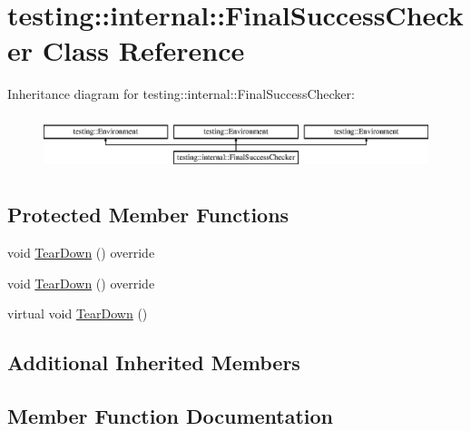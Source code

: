 \hypertarget{classtesting_1_1internal_1_1_final_success_checker}{}\section{testing\+::internal\+::Final\+Success\+Checker Class Reference}
\label{classtesting_1_1internal_1_1_final_success_checker}
Inheritance diagram for testing\+::internal\+::Final\+Success\+Checker\+:\begin{figure}[H]
\begin{center}
\leavevmode
\includegraphics[height=1.595442cm]{dd/d88/classtesting_1_1internal_1_1_final_success_checker}
\end{center}
\end{figure}
\subsection*{Protected Member Functions}
\begin{DoxyCompactItemize}
\item 
void \mbox{\hyperlink{classtesting_1_1internal_1_1_final_success_checker_a15ba1169b52bbf73a3ccea0c9f55cefd}{Tear\+Down}} () override
\item 
void \mbox{\hyperlink{classtesting_1_1internal_1_1_final_success_checker_a15ba1169b52bbf73a3ccea0c9f55cefd}{Tear\+Down}} () override
\item 
virtual void \mbox{\hyperlink{classtesting_1_1internal_1_1_final_success_checker_a8f39d12a1f2bfe8c6c04b5c6749382c9}{Tear\+Down}} ()
\end{DoxyCompactItemize}
\subsection*{Additional Inherited Members}


\subsection{Member Function Documentation}
\mbox{\label{classtesting_1_1internal_1_1_final_success_checker_a15ba1169b52bbf73a3ccea0c9f55cefd}} 
